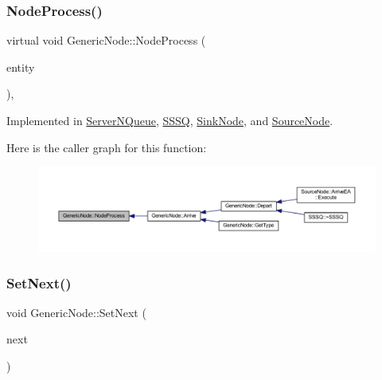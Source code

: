 \subsubsection{\texorpdfstring{Node\+Process()}{NodeProcess()}}
{\footnotesize\ttfamily virtual void Generic\+Node\+::\+Node\+Process (\begin{DoxyParamCaption}\item[{\hyperlink{class_entity}{Entity} $\ast$}]{entity }\end{DoxyParamCaption})\hspace{0.3cm}{\ttfamily [protected]}, {}}



Implemented in \hyperlink{class_server_n_queue_adbc0e634171f6dc0785f2e49659663f7}{Server\+N\+Queue}, \hyperlink{class_s_s_s_q_a21ff1a4817052985747b6df51bf5d643}{S\+S\+SQ}, \hyperlink{class_sink_node_a5f3fe2c195c3bb154f27bdf3ae27dd27}{Sink\+Node}, and \hyperlink{class_source_node_a666a65bd2424a8f56d8f08260c09c0b4}{Source\+Node}.

Here is the caller graph for this function\+:
\nopagebreak
\begin{figure}[H]
\begin{center}
\leavevmode
\includegraphics[width=350pt]{class_generic_node_ae942258a57f211072d179da470579add_icgraph}
\end{center}
\end{figure}
\mbox{\label{class_generic_node_ab627bbdbaaef832b9b79199bac113422}} 
\subsubsection{\texorpdfstring{Set\+Next()}{SetNext()}}
{\footnotesize\ttfamily void Generic\+Node\+::\+Set\+Next (\begin{DoxyParamCaption}\item[{\hyperlink{class_generic_node}{Generic\+Node} $\ast$}]{next }\end{DoxyParamCaption})}



